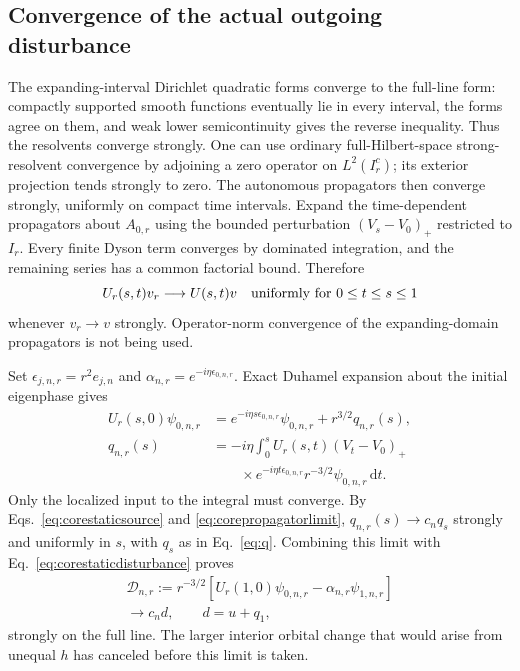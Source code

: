 \documentclass[aps,pra,reprint,superscriptaddress,longbibliography]{revtex4-2}
\newcommand{\dd}{\mathrm d}
\begin{document}
\subsection{Convergence of the actual outgoing disturbance}

The expanding-interval Dirichlet quadratic forms converge to the
full-line form: compactly supported smooth functions eventually lie in
every interval, the forms agree on them, and weak lower semicontinuity
gives the reverse inequality. Thus the resolvents converge strongly.
One can use ordinary full-Hilbert-space strong-resolvent convergence by
adjoining a zero operator on $L^2(I_r^c)$; its exterior projection tends
strongly to zero. The autonomous propagators then converge strongly,
uniformly on compact time intervals. Expand the time-dependent
propagators about $A_{0,r}$ using the bounded perturbation
$(V_s-V_0)_+$ restricted to $I_r$. Every finite Dyson term converges by dominated integration,
and the remaining series has a common factorial bound. Therefore
\begin{equation}
 U_r(s,t)v_r\longrightarrow U(s,t)v
 \quad\hbox{uniformly for }0\le t\le s\le1
 \label{eq:corepropagatorlimit}
\end{equation}
whenever $v_r\to v$ strongly. Operator-norm convergence of the
expanding-domain propagators is not being used.

Set $\epsilon_{j,n,r}=r^2e_{j,n}$ and
$\alpha_{n,r}=e^{-i\eta\epsilon_{0,n,r}}$. Exact Duhamel expansion about
the initial eigenphase gives
\begin{align}
 U_r(s,0)\psi_{0,n,r}
 &=e^{-i\eta s\epsilon_{0,n,r}}\psi_{0,n,r}
          +r^{3/2}q_{n,r}(s),\label{eq:coreduhamel}\\
 q_{n,r}(s)
 &=-i\eta\int_0^sU_r(s,t)(V_t-V_0)_+\nonumber\\
 &\qquad\times e^{-i\eta t\epsilon_{0,n,r}}
         r^{-3/2}\psi_{0,n,r}\,\dd t.
 \label{eq:coreduhamelsource}
\end{align}
Only the localized input to the integral must converge. By
Eqs.~\eqref{eq:corestaticsource} and \eqref{eq:corepropagatorlimit},
$q_{n,r}(s)\to c_nq_s$ strongly and uniformly in $s$, with $q_s$ as in
Eq.~\eqref{eq:q}. Combining this limit with
Eq.~\eqref{eq:corestaticdisturbance} proves
\begin{equation}
 \begin{gathered}
 \mathcal D_{n,r}:=r^{-3/2}
 [U_r(1,0)\psi_{0,n,r}-\alpha_{n,r}\psi_{1,n,r}]\\
       \longrightarrow c_nd,\qquad d=u+q_1,
 \end{gathered}
 \label{eq:coreoutgoinglimit}
\end{equation}
strongly on the full line. The larger interior orbital change that would
arise from unequal $h$ has canceled before this limit is taken.
\end{document}
